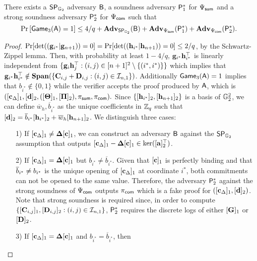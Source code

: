 \begin{lemma} There exists a $\mathsf{SP}_{\mathbb{G}_2}$ adversary $\mathcal{\mathsf{B}}$, a soundness adversary $\mathsf{P}^*_1$  for ${\Psi_{\mathsf{sum}}}$ and 
a strong soundness adversary $\mathsf{P}^*_2$ for ${\Psi_{\mathsf{com}}}$  such that
$$\Pr\left[\mathsf{Game}_3(\mathsf{A})=1\right] \leq 4/q + \mathbf{Adv}_{\mathsf{SP}_{\mathbb{G}_2}}(\mathsf{B}) +
\mathbf{Adv}_{\Psi_{\mathsf{sum}}}(\mathsf{P}^*_1)+\mathbf{Adv}_{\Psi_{\mathsf{com}}}(\mathsf{P}^*_2).$$  
\label{lemma:G3}
\end{lemma}
\begin{proof}
$\Pr[\det((\mathbf{g}_{i^*}|\mathbf{g}_{n+1}))=0]=\Pr[\det((\mathbf{h}_{i^*}|\mathbf{h}_{n+1}))=0]\leq2/q$, by the Schwartz-Zippel lemma. Then, with probability at least $1-4/q$, $\mathbf{g}_{i^*}\mathbf{h}_{i^*}^\top$ is linearly independent from
$\{\mathbf{g}_{i}\mathbf{h}_j^\top:(i,j)\in[n+1]^2\setminus\{(i^*, i^*)\}\}$ which implies that $\mathbf{g}_{i^*}\mathbf{h}_{i^*}^\top\notin\mathbf{Span}(\{\mathbf{{C}}_{i,j}+\mathbf{{D}}_{i,j}:(i,j)\in\mathcal{I}_{n,1}\})$. 
Additionally  $\mathsf{Game}_3(\mathsf{A})=1$ implies that $b_{i^*} \notin \{0,1\}$
while the verifier accepts the proof  produced by $\mathsf{A}$, which is
$ (
        [\mathbf{c}_{\Delta}]_1, [\mathbf{d}]_2,
        ([\mathbf{{\Theta}}]_1, [\mathbf{{\Pi}}]_2), 
        \pi_{\mathsf{sum}},\pi_{\mathsf{com}}
).$ Since $\{[\mathbf{h}_{i^*}]_2,[\mathbf{h}_{n+1}]_2\}$ is a basis of $\mathbb{G}_2^2$,
we can define $\overline{w}_h,\overline{b}_{i^*}$ as the unique coefficients in $\mathbb{Z}_q$ such that $[\mathbf{d}]_2= \overline{b}_{i^*} [\mathbf{h}_{i^*}]_2 + \overline{w}_h [\mathbf{h}_{n+1}]_2$.
We distinguish three cases:
\begin{itemize}
\item[1)] If $[\mathbf{c}_{\Delta}]_1 \neq \mathbf{{\Delta}} [\mathbf{c}]_1$, we can construct an adversary 
$\mathsf{B}$ against the $\mathsf{SP}_{\mathbb{G}_2}$ assumption that outputs 
$[\mathbf{c}_{\Delta}]_1-\mathbf{{\Delta}} [\mathbf{c}]_1\in\ker([\mathbf{{a}}]_2^\top)$.
\item[2)] If $[\mathbf{c}_{\Delta}]_1 = \mathbf{{\Delta}} [\mathbf{c}]_1$ but $b_{i^*} \neq \overline{b}_{i^*}$. Given that $[\mathbf{c}]_1$ is perfectly binding and that $\overline{b}_{i^*}\neq b_{i^*}$ is the unique opening of $[\mathbf{c}_\Delta]_1$ at coordinate $i^*$, both commitments can not be opened to the same value. Therefore, the adversary $\mathsf{P}^*_2$ against the strong soundness of ${\Psi_{\mathsf{com}}}$
outputs $\pi_{\mathsf{com}}$ which is a fake proof for 
$([\mathbf{c}_\Delta]_1,[\mathbf{d}]_2)$. Note that strong soundness is required since, in order to compute $\{[\mathbf{{C}}_{i,j}]_1,[\mathbf{{D}}_{i,j}]_2:(i,j)\in\mathcal{I}_{n,1}\}$, $\mathsf{P}^*_2$ requires the discrete logs of either $[\mathbf{{G}}]_1$ or $[\mathbf{{D}}]_2$.
\item[3)] If $[\mathbf{c}_{\Delta}]_1 = \mathbf{{\Delta}} [\mathbf{c}]_1$ and $b_{i^*} = \overline{b}_{i^*}$, then 

\end{itemize}
\end{proof}
